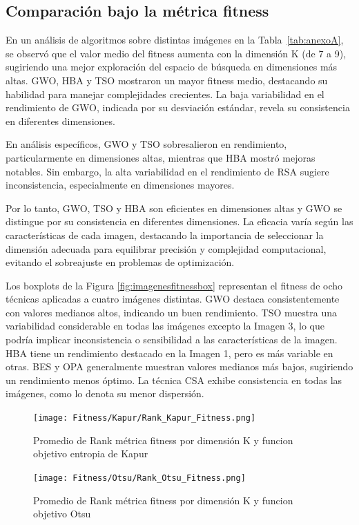 \documentclass[conference]{IEEEtran}
\begin{document}
\subsection{Comparación bajo la métrica fitness}
\noindent En un análisis de algoritmos sobre distintas imágenes en la Tabla~\ref{tab:anexoA}, se observó que el valor medio del fitness aumenta con la dimensión K (de 7 a 9), sugiriendo una mejor exploración del espacio de búsqueda en dimensiones más altas. GWO, HBA y TSO mostraron un mayor fitness medio, destacando su habilidad para manejar complejidades crecientes. La baja variabilidad en el rendimiento de GWO, indicada por su desviación estándar, revela su consistencia en diferentes dimensiones.

\noindent En análisis específicos, GWO y TSO sobresalieron en rendimiento, particularmente en dimensiones altas, mientras que HBA mostró mejoras notables. Sin embargo, la alta variabilidad en el rendimiento de RSA sugiere inconsistencia, especialmente en dimensiones mayores.

\noindent Por lo tanto, GWO, TSO y HBA son eficientes en dimensiones altas y GWO se distingue por su consistencia en diferentes dimensiones. La eficacia varía según las características de cada imagen, destacando la importancia de seleccionar la dimensión adecuada para equilibrar precisión y complejidad computacional, evitando el sobreajuste en problemas de optimización.


\noindent Los boxplots  de la Figura \ref{fig:imagenesfitnessbox} representan el fitness de ocho técnicas aplicadas a cuatro imágenes distintas. GWO destaca consistentemente con valores medianos altos, indicando un buen rendimiento. TSO muestra una variabilidad considerable en todas las imágenes excepto la Imagen 3, lo que podría implicar inconsistencia o sensibilidad a las características de la imagen. HBA tiene un rendimiento destacado en la Imagen 1, pero es más variable en otras. BES y OPA generalmente muestran valores medianos más bajos, sugiriendo un rendimiento menos óptimo. La técnica CSA exhibe consistencia en todas las imágenes, como lo denota su menor dispersión.

\begin{figure}[!htb]
	\centering
	\texttt{[image: Fitness/Kapur/Rank\_Kapur\_Fitness.png]}
	\caption{Promedio de Rank métrica fitness por dimensión K y funcion objetivo entropia de Kapur}
	\label{fig:fig510}
\end{figure}
\begin{figure}[!htb]
	\centering
	\texttt{[image: Fitness/Otsu/Rank\_Otsu\_Fitness.png]}
	\caption{Promedio de Rank métrica fitness por dimensión K y funcion objetivo Otsu}
	\label{fig:fig510}
\end{figure}
\end{document}
